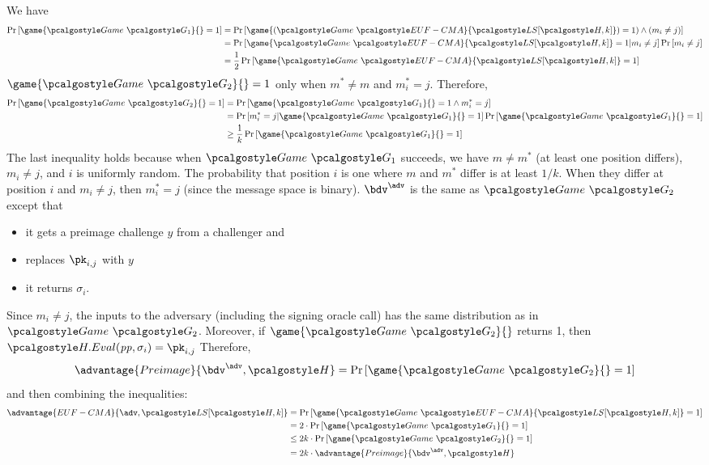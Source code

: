 \ifsolutions
\begin{mysolution}
   We have
  \begin{align*}
      \pr{\game{\Game~\algo{G_1}}{} = 1} &= \pr{\game{(\Game~\algo{EUF-CMA}}{\algo{LS[\algo{H}, k]}}) = 1) \wedge (m_i \neq j)} \\
      &= \pr{\game{\Game~\algo{EUF-CMA}}{\algo{LS[\algo{H}, k]}} = 1 | m_i \neq j} \pr{m_i \neq j} \\
      &= \frac{1}{2}\pr{\game{\Game~\algo{EUF-CMA}}{\algo{LS[\algo{H}, k]}} = 1} \\
  \end{align*}
  $\game{\Game~\algo{G_2}}{} = 1$ only when $m^* \neq m$ and $m^*_i = j$.
  Therefore,
  \begin{align*}
      \pr{\game{\Game~\algo{G_2}}{} = 1} &= \pr{\game{\Game~\algo{G_1}}{} = 1 \wedge m^*_i = j} \\
      &= \pr{m^*_i = j | \game{\Game~\algo{G_1}}{} = 1} \pr{\game{\Game~\algo{G_1}}{} = 1} \\
      &\geq \frac{1}{k}\pr{\game{\Game~\algo{G_1}}{} = 1} \\
  \end{align*}
  The last inequality holds because when $\Game~\algo{G_1}$ succeeds, we have $m \neq m^*$ (at least one position differs), $m_i \neq j$, and $i$ is uniformly random. The probability that position $i$ is one where $m$ and $m^*$ differ is at least $1/k$. When they differ at position $i$ and $m_i \neq j$, then $m^*_i = j$ (since the message space is binary).
  $\bdv^\adv$ is the same as $\Game~\algo{G_2}$ except that
  \begin{itemize}
      \item it gets a preimage challenge $y$ from a challenger and
      \item replaces $\pk_{i, j}$ with $y$
      \item it returns $\sigma_i$.
  \end{itemize}
  Since $m_i \neq j$, the inputs to the adversary (including the signing oracle call) has the same distribution as in $\Game~\algo{G_2}$.
  Moreover, if $\game{\Game~\algo{G_2}}{}$ returns 1, then $\algo{H.Eval}(\params, \sigma_i) = \pk_{i, j}$
  Therefore,
  \[
  \advantage{Preimage}{\bdv^\adv, \algo{H}} = \pr{\game{\Game~\algo{G_2}}{} = 1}
  \]
  and then combining the inequalities:
  \begin{align*}
    \advantage{EUF-CMA}{\adv, \algo{LS}[\algo{H, k}]} &= \pr{\game{\Game~\algo{EUF-CMA}}{\algo{LS[\algo{H}, k]}} = 1} \\
    &= 2 \cdot \pr{\game{\Game~\algo{G_1}}{} = 1} \\
    &\leq 2k \cdot \pr{\game{\Game~\algo{G_2}}{} = 1} \\
    &= 2k \cdot \advantage{Preimage}{\bdv^\adv, \algo{H}}
  \end{align*}
\end{mysolution}
\fi

